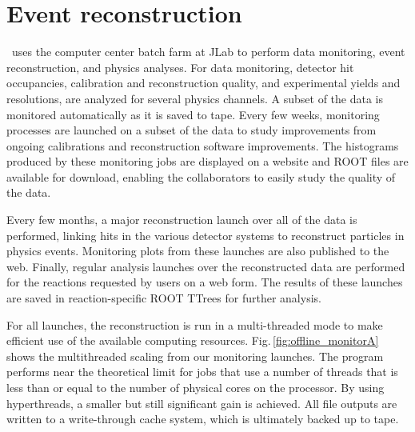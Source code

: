 

\section[Event reconstruction]{Event reconstruction \label{sec:reconstruction}} 


\GX~uses the computer center batch farm at JLab to perform data monitoring, event reconstruction, and physics analyses.  For data monitoring, detector hit occupancies, calibration and reconstruction quality, and experimental yields and resolutions, are analyzed for several physics channels.  A subset of the data is monitored automatically as it is saved to tape.  Every few weeks, monitoring processes are launched on a subset of the data to study improvements from ongoing calibrations and reconstruction software improvements.  The histograms produced by these monitoring jobs are displayed on a website and ROOT files are available for download, enabling the collaborators to easily study the quality of the data. 

Every few months, a major reconstruction launch over all of the data is performed, linking hits in the various detector systems to reconstruct particles in physics events.  Monitoring plots from these launches are also published to the web. Finally, regular analysis launches over the reconstructed data are performed for the reactions requested by users on a web form. The results of these launches are saved in reaction-specific ROOT TTrees for further analysis.

For all launches, the reconstruction is run in a multi-threaded mode to make efficient use of the available computing resources. Fig.\,\ref{fig:offline_monitorA} shows the multithreaded scaling from our monitoring launches. The program performs near the theoretical limit for jobs that use a number of threads that is less than or equal to the number of physical cores on the processor. By using hyperthreads, a smaller but still significant gain is achieved.
All file outputs are written to a write-through cache system, which is ultimately backed up to tape.

